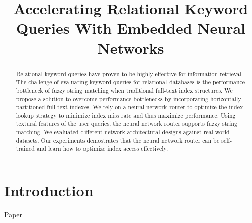 \documentclass{IEEEtran}
\begin{document}
\title{
    Accelerating Relational Keyword Queries With Embedded Neural Networks
}
\author{
\and
{}
\and
{}
\and
{}
\and
{}
\and
{}
}
\maketitle

\begin{abstract}
Relational keyword queries have proven to be highly effective for
information retrieval.  The challenge of evaluating keyword queries for relational databases is the performance bottleneck of fuzzy string matching when traditional full-text index structures.  We propose a solution to overcome performance bottlenecks by incorporating horizontally partitioned full-text indexes.  We rely on a neural network router to optimize the index lookup strategy to minimize index miss rate and thus maximize performance.  Using textural features of the user queries, the neural network router supports fuzzy string matching.  We evaluated different network architectural designs against real-world datasets.  Our experiments demostrates that the neural network router can be self-trained and learn how to optimize index access effectively. 
\end{abstract}

\section{Introduction}

Paper \cite{du2021tabularnet}



\end{document}
